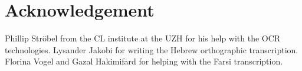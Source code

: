 {}
\chapter*{Acknowledgement}

Phillip Ströbel from the CL institute at the UZH for his help with the OCR technologies. 
Lysander Jakobi for writing the Hebrew orthographic transcription. Florina Vogel and Gazal Hakimifard for helping with the Farsi transcription. 

\newpage